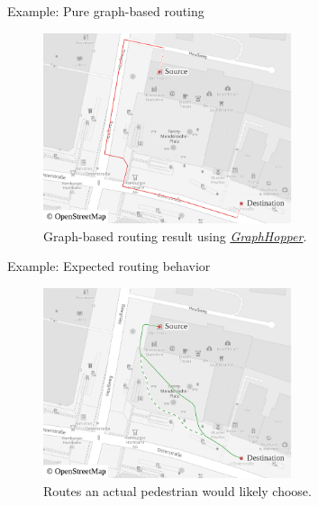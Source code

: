 \documentclass[xcolor={x11names}]{beamer}
\newenvironment{figcenter}
{%
	\parskip=0pt%
	\par%
	\nopagebreak%
	\centering%
}%
{%
	\par%
	\noindent%
	\ignorespacesafterend%
}
\begin{document}
		\begin{frame}{Example: Pure graph-based routing}
			\begin{figure}[t]
				\begin{figcenter}
					\includegraphics[width=0.65\textwidth]{images/qgis-routing-osterstrasse_routing.pdf}
				\end{figcenter}
				\caption{Graph-based routing result using \href{https://www.osm.org/directions?engine=graphhopper\_foot\&route=53.57657,9.95210;53.57601,9.95268}{\emph{GraphHopper}}.}
			\end{figure}
		\end{frame}
		
		\begin{frame}{Example: Expected routing behavior}
			\begin{figure}[t]
				\begin{figcenter}
					\includegraphics[width=0.65\textwidth]{images/qgis-routing-osterstrasse_expected.pdf}
				\end{figcenter}
				\caption{Routes an actual pedestrian would likely choose.}
			\end{figure}
		\end{frame}
		
\end{document}

